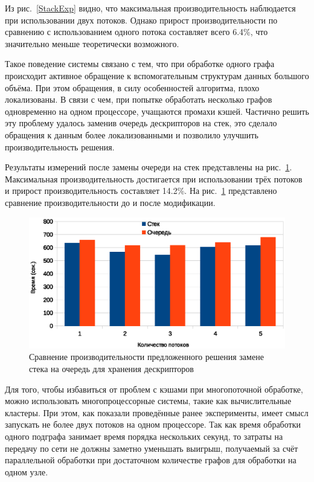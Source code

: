 \documentclass[14pt]{matmex-diploma}
\begin{document}
Из рис.~\ref{StackExp} видно, что максимальная производительность наблюдается при использовании двух потоков. Однако прирост производительности по сравнению с использованием одного потока составляет всего 6.4\%, что значительно меньше теоретически возможного.

Такое поведение системы связано с тем, что при обработке одного графа происходит активное обращение к вспомогательным структурам данных большого объёма. При этом обращения, в силу особенностей алгоритма, плохо локализованы. В связи с чем, при попытке обработать несколько графов одновременно на одном процессоре, учащаются промахи кэшей. Частично решить эту проблему удалось заменив очередь дескрипторов на стек, это сделало обращения к данным более локализованными и позволило улучшить производительность решения. 

Результаты измерений после замены очереди на стек представлены на рис.~\ref{StackExp2}. Максимальная производительность достигается при использовании трёх потоков и прирост производительность составляет 14.2\%. На рис.~\ref{StackExp2} представлено сравнение производительности до и после модификации.



\begin{figure}
 \centering
 \includegraphics[width=15cm]{pics/StackVSQueue.eps}
 \caption{Сравнение производительности предложенного решения замене стека на очередь для хранения дескрипторов }
 \label{StackExp2}
\end{figure}

Для того, чтобы избавиться от проблем с кэшами при многопоточной обработке, можно использовать многопроцессорные системы, такие как вычислительные кластеры. При этом, как показали проведённые ранее эксперименты, имеет смысл запускать не более двух потоков на одном процессоре. Так как время обработки одного подграфа занимает время порядка нескольких секунд, то затраты на передачу по сети не должны заметно уменьшать выигрыш, получаемый за счёт параллельной обработки при достаточном количестве графов для обработки на одном узле.  
\end{document}
